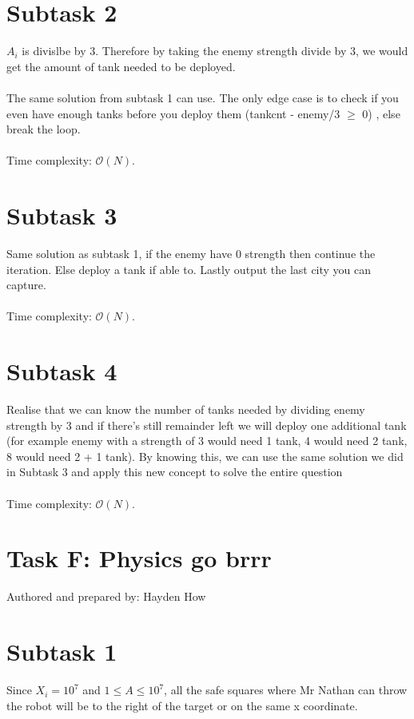\documentclass{report}
\begin{document}
\section*{Subtask 2}
$A_{i}$ is divislbe by 3. Therefore by taking the enemy strength divide by 3, we would get the amount of tank needed to be deployed. 
\\\\
The same solution from subtask 1 can use. The only edge case is to check if you even have enough tanks before you deploy them (tank\textunderscore cnt - enemy/3 $\geq$ 0) , else break the loop.
\\\\
Time complexity: $\mathcal{O}(N)$.

\section*{Subtask 3}
Same solution as subtask 1, if the enemy have 0 strength then continue the iteration. Else deploy a tank if able to. Lastly output the last city you can capture.
\\\\
Time complexity: $\mathcal{O}(N)$.

\section*{Subtask 4}
Realise that we can know the number of tanks needed by dividing enemy strength by 3 and if there's still remainder left we will deploy one additional tank (for example enemy with a strength of 3 would need 1 tank, 4 would need 2 tank, 8 would need 2 + 1 tank). By knowing this, we can use the same solution we did in Subtask 3 and apply this new concept to solve the entire question
\\\\
Time complexity: $\mathcal{O}(N)$.

\pagebreak
\hfill \break \hfill \break

\section*{Task F: Physics go brrr}
Authored and prepared by: Hayden How
\section*{Subtask 1}
Since $X_i = 10^7$ and $1 \leq A \leq 10^7$, all the safe squares where Mr Nathan can throw the robot will be to the right of the target or on the same x coordinate.
\end{document}
